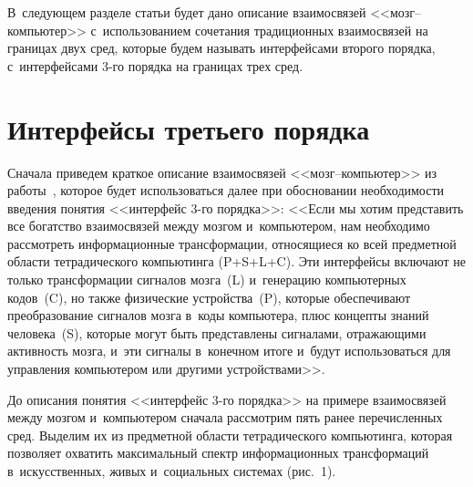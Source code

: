 \begin{multicols}{2}
В~следующем разделе статьи будет дано описание 
взаимосвязей <<мозг--ком\-пью\-тер>> с~использованием сочетания 
традиционных взаимосвязей на границах двух сред, которые будем называть 
интерфейсами второго порядка, с~интерфейсами 3-го порядка на границах трех 
сред.

\vspace*{-6pt}
  
\section{Интерфейсы третьего порядка}

\vspace*{-4pt}
    
  Сначала приведем краткое описание вза\-имо\-связей <<мозг--ком\-пью\-тер>> 
из работы~\cite{12-zat}, которое будет использоваться далее при обосновании 
необходимости введения понятия <<интерфейс \mbox{3-го} порядка>>:
  <<Если мы хотим представить все богатство вза\-имо\-свя\-зей между мозгом 
и~компьютером, нам необходимо рассмотреть информационные 
трансформации, относящиеся ко всей предметной об\-ласти тетрадического 
компьютинга (P\;+\;S\;+\;L\;+\;C). Эти интерфейсы включают не только 
трансформации сигналов моз\-га~(L) и~генерацию компьютерных кодов~(C), но 
также физические устройства~(P), которые обеспечивают преобразование 
сигналов мозга в~коды компьютера, плюс кон\-цеп\-ты знаний человека~(S), 
которые могут быть пред\-став\-ле\-ны сигналами, отражающими 
активность мозга, и~эти сигналы в~конечном итоге и~будут использоваться для управ\-ле\-ния 
компьютером или другими устройствами>>.
  
  До описания понятия <<интерфейс 3-го порядка>> на примере взаимосвязей 
между мозгом и~компьютером сначала рассмотрим пять ранее пе\-ре\-чис\-лен\-ных 
сред. Выделим их из пред\-мет\-ной об\-ласти тетрадического компьютинга, которая 
поз\-во\-ля\-ет охватить максимальный спектр информационных транс\-фор\-ма\-ций 
в~искусственных, живых и~социальных системах (рис.~1).

\begin{figure*} %
\vspace*{1pt}
    \begin{center}  
  \mbox{%
 \epsfxsize=89.141mm 
 }
\end{center}
\vspace*{-6pt}
\vspace*{3pt}
\end{figure*}
  


\end{multicols}
